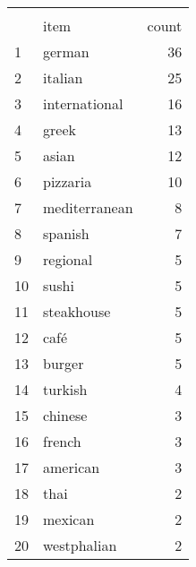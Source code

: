 \begin{tabular}{llr}
\\[-1.8ex]\hline
\hline \\[-1.8ex]
{} &              item &  count \\
\midrule
1  &            german &     36 \\
2  &           italian &     25 \\
3  &     international &     16 \\
4  &             greek &     13 \\
5  &             asian &     12 \\
6  &          pizzaria &     10 \\
7  &     mediterranean &      8 \\
8  &           spanish &      7 \\
9  &          regional &      5 \\
10 &             sushi &      5 \\
11 &        steakhouse &      5 \\
12 &              café &      5 \\
13 &            burger &      5 \\
14 &           turkish &      4 \\
15 &           chinese &      3 \\
16 &            french &      3 \\
17 &          american &      3 \\
18 &              thai &      2 \\
19 &           mexican &      2 \\
20 &       westphalian &      2 \\
\bottomrule
\end{tabular}

